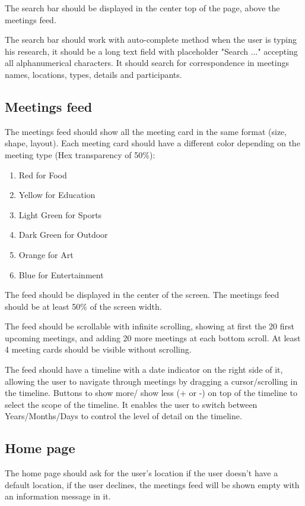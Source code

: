 \documentclass[conference]{IEEEtran}
\begin{document}
The search bar should be displayed in the center top of the page, above the meetings feed.

The search bar should work with auto-complete method when the user is typing his research, it should be a long text field with placeholder "Search ..." accepting all alphanumerical characters. 
It should search for correspondence in meetings names, locations, types, details and participants.

\subsection{Meetings feed}

The meetings feed should show all the meeting card in the same format (size, shape, layout). 
Each meeting card should have a different color depending on the meeting type (Hex transparency of 50\%):

\begin{enumerate}
    \item Red for Food
    \item Yellow for Education
    \item Light Green for Sports
    \item Dark Green for Outdoor
    \item Orange for Art
    \item Blue for Entertainment
\end{enumerate}

The feed should be displayed in the center of the screen.
The meetings feed should be at least 50\% of the screen width.

The feed should be scrollable with infinite scrolling, showing at first the 20 first upcoming meetings, and adding 20 more meetings at each bottom scroll.
At least 4 meeting cards should be visible without scrolling.

The feed should have a timeline with a date indicator on the right side of it, allowing the user to navigate through meetings by dragging a cursor/scrolling in the timeline.
Buttons to show more/ show less (+ or -) on top of the timeline to select the scope of the timeline. 
It enables the user to switch between Years/Months/Days to control the level of detail on the timeline.

\subsection{Home page}

The home page should ask for the user's location if the user doesn't have a default location, if the user declines, the meetings feed will be shown empty with an information message in it.
\end{document}
